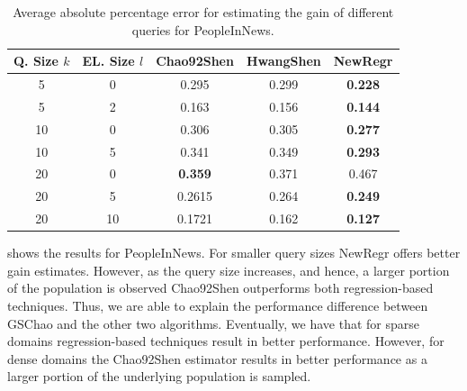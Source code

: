 \begin{table}[h]
\scriptsize
\center
\caption{Average absolute percentage error for estimating the gain of different queries for PeopleInNews.}
\vspace{-10pt}
\label{tab:peopleesterror}
\begin{tabular}{|c|c|c|c|c|}
\hline
\textbf{Q. Size $k$} & \textbf{EL. Size $l$} & \textbf{Chao92Shen} & \textbf{HwangShen} & \textbf{NewRegr} \\ \hline
5 & 0 & 0.295 & 0.299 & {\bf 0.228}\\
5 & 2 & 0.163 &  0.156 & {\bf 0.144}\\
10 & 0 &  0.306 & 0.305 & {\bf 0.277}\\
10 & 5 &  0.341 & 0.349 & {\bf 0.293}\\
20 & 0 &  {\bf 0.359}& 0.371 & 0.467 \\
20 & 5 &  0.2615 & 0.264 & {\bf 0.249}\\
20 & 10 & 0.1721 & 0.162 & {\bf 0.127}\\
\hline
\end{tabular}
\end{table}

 shows the results for PeopleInNews. For smaller query sizes NewRegr offers better gain estimates. However, as the query size increases, and hence, a larger portion of the population is observed Chao92Shen outperforms both regression-based techniques. Thus, we are able to explain the performance difference between GSChao and the other two algorithms. Eventually, we have that for sparse domains regression-based techniques result in better performance. However, for dense domains the Chao92Shen estimator results in better performance as a larger portion of the underlying population is sampled.
\fi



